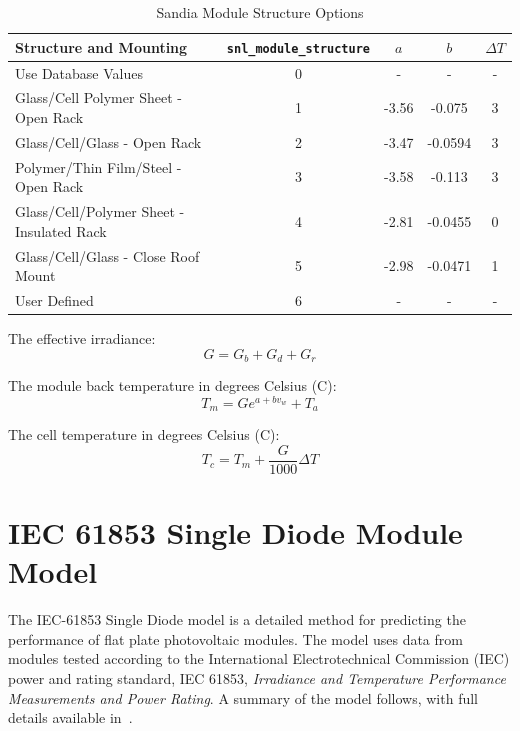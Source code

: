 \documentclass[12pt,letterpaper]{article}
\begin{document}
\begin{table}
\begin{center}
\caption{Sandia Module Structure Options}
\begin{tabular}{lcccc}
\midrule
Structure and Mounting & \texttt{snl\_module\_structure} & $a$ & $b$ & $\Delta T$ \\
\midrule
Use Database Values & 0 & - & - & - \\
Glass/Cell Polymer Sheet - Open Rack & 1 & -3.56 & -0.075 & 3 \\
Glass/Cell/Glass - Open Rack & 2 & -3.47 & -0.0594 & 3 \\
Polymer/Thin Film/Steel - Open Rack & 3 & -3.58 & -0.113 & 3 \\
Glass/Cell/Polymer Sheet - Insulated Rack & 4 & -2.81 & -0.0455 & 0 \\
Glass/Cell/Glass - Close Roof Mount & 5 & -2.98 & -0.0471 & 1 \\
User Defined & 6 & - & - & - \\
\hline
\end{tabular}
\label{tab-sandiamodstruct}
\end{center}
\end{table}

The effective irradiance:
\begin{equation}
G = G_b + G_d + G_r
\end{equation}

The module back temperature in degrees Celsius (\degree C):
\begin{equation}
T_m = G e^{a+b v_w} + T_a
\end{equation}

The cell temperature in degrees Celsius (\degree C):
\begin{equation}\label{eqn-cectemp}
T_c = T_m + \frac{G}{1000}  \Delta T
\end{equation}

\section{IEC 61853 Single Diode Module Model}\label{sec-iecmodule}

The IEC-61853 Single Diode model is a detailed method for predicting the performance of flat plate photovoltaic modules.  The model uses data from modules tested according to the International Electrotechnical Commission (IEC) power and rating standard, IEC 61853, \textit{Irradiance and Temperature Performance Measurements and Power Rating}.  A summary of the model follows, with full details available in~\cite{dobos2014}.
\end{document}
